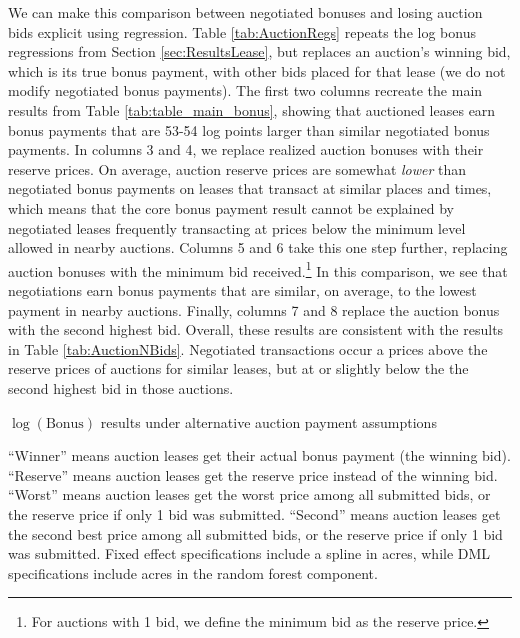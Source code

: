 \documentclass[12pt]{article}
\begin{document}
We can make this comparison between negotiated bonuses and losing auction bids explicit using regression. Table \ref{tab:AuctionRegs} repeats the log bonus regressions from Section \ref{sec:ResultsLease}, but replaces an auction's winning bid, which is its true bonus payment, with other bids placed for that lease (we do not modify negotiated bonus payments). The first two columns recreate the main results from Table \ref{tab:table_main_bonus}, showing that auctioned leases earn bonus payments that are 53-54 log points larger than similar negotiated bonus payments.  In columns 3 and 4, we replace realized auction bonuses with their reserve prices.  On average, auction reserve prices are somewhat \textit{lower} than negotiated bonus payments on leases that transact at similar places and times, which means that the core bonus payment result cannot be explained by negotiated leases frequently transacting at prices below the minimum level allowed in nearby auctions.  Columns 5 and 6 take this one step further, replacing auction bonuses with the minimum bid received.\footnote{For auctions with 1 bid, we define the minimum bid as the reserve price.}  In this comparison, we see that negotiations earn bonus payments that are similar, on average, to the lowest payment in nearby auctions.  Finally, columns 7 and 8 replace the auction bonus with the second highest bid.  Overall, these results are consistent with the results in Table \ref{tab:AuctionNBids}.  Negotiated transactions occur a prices above the reserve prices of auctions for similar leases, but at or slightly below the the second highest bid in those auctions. 

\addtolength{\tabcolsep}{12pt}
\begin{table}[H]
\begin{center}
\begin{threeparttable}
	\caption{$\log(\text{Bonus})$ results under alternative auction payment assumptions}
	\label{tab:AuctionRegs}
 	\small
   	            
    \footnotesize
    \begin{tablenotes}
    	\item ``Winner'' means auction leases get their actual bonus payment (the winning bid).  ``Reserve'' means auction leases get the reserve price instead of the winning bid.  ``Worst'' means auction leases get the worst price among all submitted bids, or the reserve price if only 1 bid was submitted.  ``Second'' means auction leases get the second best price among all submitted bids, or the reserve price if only 1 bid was submitted.  Fixed effect specifications include a spline in acres, while DML specifications include acres in the random forest component.
    \end{tablenotes}
\end{threeparttable}
\end{center}	
\end{table}
\addtolength{\tabcolsep}{-5pt} 
\end{document}
